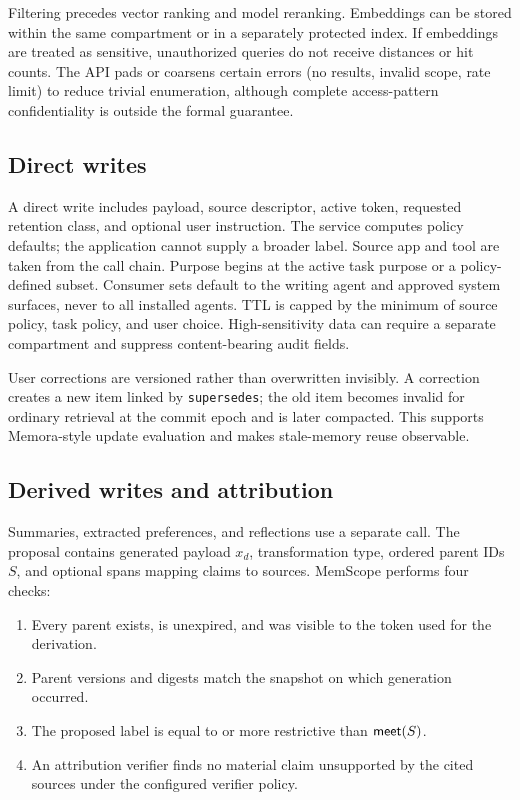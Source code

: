 Filtering precedes vector ranking and model reranking. Embeddings can be stored within the same compartment or in a separately protected index. If embeddings are treated as sensitive, unauthorized queries do not receive distances or hit counts. The API pads or coarsens certain errors (no results, invalid scope, rate limit) to reduce trivial enumeration, although complete access-pattern confidentiality is outside the formal guarantee.

\subsection{Direct writes}

A direct write includes payload, source descriptor, active token, requested retention class, and optional user instruction. The service computes policy defaults; the application cannot supply a broader label. Source app and tool are taken from the call chain. Purpose begins at the active task purpose or a policy-defined subset. Consumer sets default to the writing agent and approved system surfaces, never to all installed agents. TTL is capped by the minimum of source policy, task policy, and user choice. High-sensitivity data can require a separate compartment and suppress content-bearing audit fields.

User corrections are versioned rather than overwritten invisibly. A correction creates a new item linked by \texttt{supersedes}; the old item becomes invalid for ordinary retrieval at the commit epoch and is later compacted. This supports Memora-style update evaluation \citep{uddin2026memora} and makes stale-memory reuse observable.

\subsection{Derived writes and attribution}

Summaries, extracted preferences, and reflections use a separate call. The proposal contains generated payload $x_d$, transformation type, ordered parent IDs $S$, and optional spans mapping claims to sources. MemScope performs four checks:

\begin{enumerate}[leftmargin=*]
  \item Every parent exists, is unexpired, and was visible to the token used for the derivation.
  \item Parent versions and digests match the snapshot on which generation occurred.
  \item The proposed label is equal to or more restrictive than $\mathsf{meet}(S)$.
  \item An attribution verifier finds no material claim unsupported by the cited sources under the configured verifier policy.
\end{enumerate}

